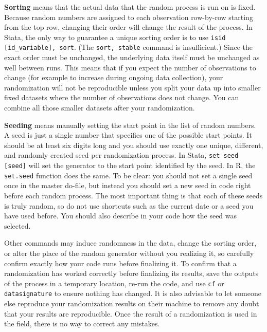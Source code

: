 \textbf{Sorting} means that the actual data that the random process is run on is fixed.
Because random numbers are assigned to each observation row-by-row starting from
the top row,
changing their order will change the result of the process.
In Stata, the only way to guarantee a unique sorting order is to use
\texttt{isid [id\_variable], sort}.
(The \texttt{sort, stable} command is insufficient.)
Since the exact order must be unchanged,
the underlying data itself must be unchanged as well between runs.
This means that if you expect the number of observations to change
(for example to increase during ongoing data collection),
your randomization will not be reproducible unless you split your data up into
smaller fixed datasets where the number of observations does not change.
You can combine all
those smaller datasets after your randomization.


\textbf{Seeding} means manually setting the start point in the list of random numbers.
A seed is just a single number that specifies one of the possible start points.
It should be at least six digits long and you should use exactly
one unique, different, and randomly created seed per randomization process.
In Stata, \texttt{set seed [seed]} will set the generator
to the start point identified by the seed.
In R, the \texttt{set.seed} function does the same.
To be clear: you should not set a single seed once in the master do-file,
but instead you should set a new seed in code right before each random process.
The most important thing is that each of these seeds is truly random,
so do not use shortcuts such as the current date or a seed you have used before.
You should also describe in your code how the seed was selected.

Other commands may induce randomness in the data,
change the sorting order,
or alter the place of the random generator without you realizing it,
so carefully confirm exactly how your code runs before finalizing it.
To confirm that a randomization has worked correctly before finalizing its results,
save the outputs of the process in a temporary location,
re-run the code, and use \texttt{cf} or \texttt{datasignature} to ensure
nothing has changed. It is also advisable to let someone else reproduce your
randomization results on their machine to remove any doubt that your results
are reproducible.
Once the result of a randomization is used in the field,
there is no way to correct any mistakes.

